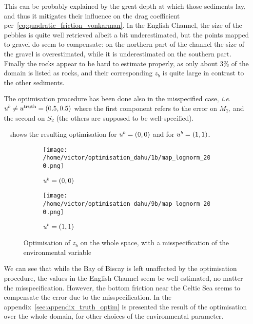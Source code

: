 \documentclass[../../Main_ManuscritThese.tex]{subfiles}
\newcommand{\zob}{z_b}
\begin{document}
This can be probably explained by the great depth at which those
sediments lay, and thus it mitigates their influence on the drag
coefficient per~\cref{eq:quadratic_friction_vonkarman}. In the English
Channel, the size of the pebbles is quite well retrieved albeit a bit
underestimated, but the points mapped to gravel do seem to compensate:
on the northern part of the channel the size of the gravel is
overestimated, while it is underestimated on the southern part.
Finally the rocks appear to be hard to estimate properly, as only about
3\% of the domain is listed as rocks, and their corresponding $\zob$
is quite large in contrast to the other sediments.


\clearpage
The optimisation procedure has been done also in the misspecified
case, \emph{i.e.}
$u^b \neq u^{\mathrm{truth}}=(\num{0.5}, \num{0.5})$ where the
first component refers to the error on $M_2$, and the second on $S_2$
(the others are supposed to be well-specified).

~ shows the resulting optimisation
for $\uu^b=(0, 0) $ and for $\uu^b=(1, 1)$. %
\begin{figure}[ht]
  \centering
  \begin{subfigure}{0.9\textwidth}
    \centering
  \texttt{[image: /home/victor/optimisation\_dahu/1b/map\_lognorm\_200.png]}
  \caption[Optimisation of $\zob$ on the whole space,
  $\uu^b = (0, 0)$]{\label{fig:optimization_1b} $\uu^b=(0, 0)$}
\end{subfigure}
\begin{subfigure}{0.9\textwidth}
  \centering
  \texttt{[image: /home/victor/optimisation\_dahu/9b/map\_lognorm\_200.png]}
  \caption[Optimisation of $\zob$ on the whole
  space, $\uu^b = (1, 1)$]{\label{fig:optimization_9b} $\uu^b=(1, 1)$}
\end{subfigure}
\caption[Optimisation of $\zob$, misspecified case]{\label{fig:optim_croco_misspecified} Optimisation of $\zob$ on the whole space, with a
  misspecification of the environmental variable}
\end{figure}

 We can see that while the Bay of Biscay is
left unaffected by the optimisation procedure, the values in the
English Channel seem be well estimated, no matter the
misspecification. However, the bottom friction near the Celtic Sea
seems to compensate the error due to the misspecification. In the
appendix~\cref{sec:appendix_truth_optim} is presented the result of
the optimisation over the whole domain, for other choices of the
environmental parameter.
\end{document}
